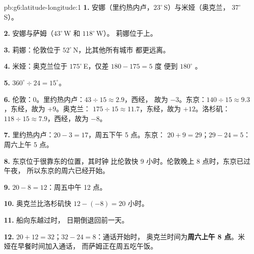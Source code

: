 \begin{solution}{pb:g6:latitude-longitude:1}
\textbf{1.} 安娜（里约热内卢，$23^\circ$\,S）与米娅（奥克兰，
$37^\circ$\,S）。

\textbf{2.} 安娜与萨姆（$43^\circ$\,W 和 $118^\circ$\,W）。
莉娜位于上。

\textbf{3.} 莉娜：伦敦位于 $52^\circ$\,N，比其他所有城市
都更远离。

\textbf{4.} 米娅：奥克兰位于 $175^\circ$\,E，仅差 $180 - 175 = 5$ 度
便到 $180^\circ$ 。

\textbf{5.} $360^\circ \div 24 = 15^\circ$。

\textbf{6.} 伦敦：$0$。里约热内卢：$43 \div 15 \approx 2.9$，西经，
故为 $-3$。东京：$140 \div 15 \approx 9.3$，东经，故为 $+9$。奥克兰：
$175 \div 15 \approx 11.7$，东经，故为 $+12$。洛杉矶：
$118 \div 15 \approx 7.9$，西经，故为 $-8$。

\textbf{7.} 里约热内卢：$20 - 3 = 17$，周五下午 5 点。东京：
$20 + 9 = 29$；$29 - 24 = 5$：周六上午 5 点。

\textbf{8.} 东京位于很靠东的位置，其时钟
比伦敦快 9 小时。伦敦晚上 8 点时，东京已过午夜，
所以东京的周六已经开始。

\textbf{9.} $20 - 8 = 12$：周五中午 12 点。

\textbf{10.} 奥克兰比洛杉矶快 $12 - (-8) = 20$ 小时。

\textbf{11.} 船向东越过时，
日期倒退回前一天。

\textbf{12.} $20 + 12 = 32$；$32 - 24 = 8$：通话开始时，
奥克兰时间为\textbf{周六上午 8 点}。米娅在早餐时间加入通话，
而萨姆正在周五吃午饭。
\end{solution}
